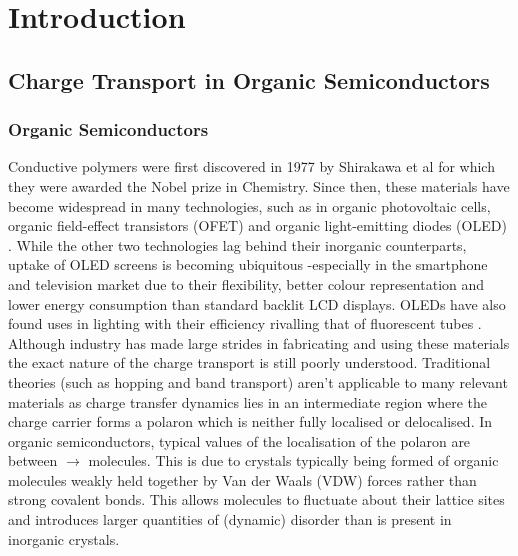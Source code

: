 \chapter{Introduction}
\label{chap:intro}

\section{Charge Transport in Organic Semiconductors}
\subsection{Organic Semiconductors}
Conductive polymers were first discovered in 1977 by Shirakawa et al  \cite{chiang_electrical_1977, Shirakawa1977Jan} for which they were awarded the Nobel prize in Chemistry. Since then, these materials have become widespread in many technologies, such as in organic photovoltaic cells\cite{Kippelen2009}, organic field-effect transistors (OFET) \cite{Malachowski2010Jun} and organic light-emitting diodes (OLED) \cite{ThejoKalyani2012Jun}. While the other two technologies lag behind their inorganic counterparts, uptake of OLED screens is becoming ubiquitous -especially in the smartphone and television market due to their flexibility, better colour representation and lower energy consumption than standard backlit LCD displays. OLEDs have also found uses in lighting with their efficiency rivalling that of fluorescent tubes \cite{Reineke2009May, OLED_lighting}. Although\remove{,} industry has made large strides in fabricating and using these materials the exact nature of the charge transport is still poorly understood. Traditional theories (such as hopping and band transport) aren't applicable to many relevant materials \cite{coropceanu_charge_2007, Giannini2019, C0CS00198H, Fratini_2016, yavuz_dichotomy_2017} as charge transfer dynamics lies in an intermediate region where the charge carrier forms a polaron which is neither fully localised or delocalised. In organic semiconductors, typical values of the localisation of the polaron are between  $\rightarrow$  molecules. This is due to crystals typically being formed of organic molecules weakly held together by Van der Waals (VDW) forces rather than strong covalent bonds. This allows molecules to fluctuate about their lattice sites and introduces larger quantities of (dynamic) disorder than is present in inorganic crystals. 
\\\\
